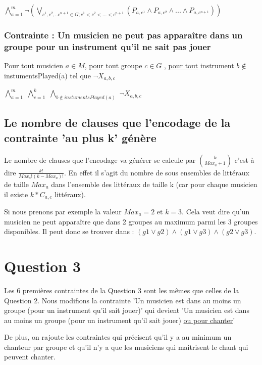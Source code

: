 \documentclass[a4paper,10pt]{article}
\begin{document}
$ \bigwedge \limits_{a=1}^{m} \neg ( \bigvee \limits_{c^1,c^2,..c^{n+1} \in G; c^1 < c^2 <...<c^{n+1}} ( P_{a,c^1} \wedge P_{a,c^2} \wedge ... \wedge P_{a,c^{n+1}} ))$

\subsubsection{Contrainte : Un musicien ne peut pas apparaître dans un groupe pour un instrument qu'il ne sait pas jouer}


\underline{Pour tout} musicien $a \in M $, \underline{pour tout} groupe $c \in G$ , \underline{pour tout} instrument $b \notin $ instumentsPlayed(a)  tel que $\neg X_{a,b,c}$


$\bigwedge \limits_{a=1}^{m}$  $\bigwedge \limits_{c=1}^{k}$ $\bigwedge \limits_{b \notin instumentsPlayed(a) }$  $\neg X_{a,b,c}$


\subsection{ Le nombre de clauses que l'encodage de la contrainte 'au plus k' génère}


Le nombre de clauses que l'encodage va générer se calcule par $k \choose Max_a + 1$ c'est à dire $\frac {k!}{Max_a ! (k - Max_a) !} $. En effet il s'agit du nombre de sous ensembles
de littéraux de taille $Max_a$ dans l'ensemble des littéraux de taille k (car pour chaque musicien il existe $k*C_{a,c}$ littéraux).

Si nous prenons par exemple la valeur $Max_a = 2 $ et $k=3$. Cela veut dire qu'un musicien ne peut apparaître que dans 2 groupes au maximum parmi les 3 groupes disponibles.
Il peut donc se trouver dans : $(g1 \vee g2) \wedge (g1 \vee g3) \wedge (g2 \vee g3).$ 

\section{Question 3}

Les 6 premières contraintes de la Question 3 sont les mêmes que celles de la Question 2. Nous modifions la contrainte 'Un musicien est dans au moins un groupe (pour un instrument qu'il sait jouer)' qui devient 'Un musicien est dans au moins un groupe (pour un instrument qu'il sait jouer) \underline{ou pour chanter}'

De plus, on rajoute les contraintes qui précisent qu'il y a au minimum un chanteur par groupe et qu'il n'y a que les musiciens qui maitrisent le chant qui peuvent chanter.
\end{document}
